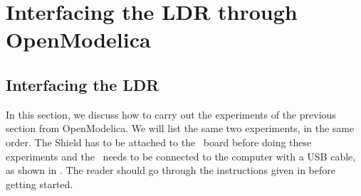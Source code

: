 \section{Interfacing the LDR through OpenModelica}
\subsection{Interfacing the LDR}
In this section, we discuss how to carry out the experiments of the
previous section from OpenModelica.  We will list the same two experiments,
in the same order.  The Shield has to be attached to the \arduino\ board
before doing these experiments and the \arduino\ needs to be connected to the computer 
with a USB cable, as shown in .
The reader should go through the instructions given in
 before getting started.

